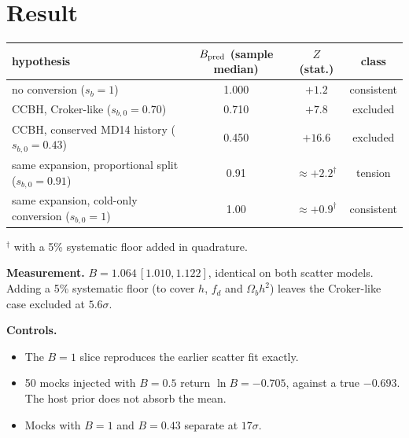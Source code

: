 \documentclass[10pt]{article}
\begin{document}
\section{Result}
\begin{center}
\begin{tabular}{lccc}
\toprule
hypothesis & $B_{\rm pred}$ (sample median) & $Z$ (stat.) & class\\
\midrule
no conversion ($s_b=1$) & 1.000 & $+1.2$ & consistent\\
CCBH, Croker-like ($s_{b,0}=0.70$) & 0.710 & $+7.8$ & excluded\\
CCBH, conserved MD14 history ($s_{b,0}=0.43$) & 0.450 & $+16.6$ & excluded\\
same expansion, proportional split ($s_{b,0}=0.91$) & 0.91 & $\approx+2.2^{\dagger}$ & tension\\
same expansion, cold-only conversion ($s_{b,0}=1$) & 1.00 & $\approx+0.9^{\dagger}$ & consistent\\
\bottomrule
\end{tabular}
\end{center}
{\footnotesize $^\dagger$ with a 5\% systematic floor added in quadrature.}

\textbf{Measurement.} $B=1.064\,[1.010,1.122]$, identical on both scatter models. Adding a 5\% systematic floor (to cover $h$, $f_d$ and $\Omega_bh^2$) leaves the Croker-like case excluded at $5.6\sigma$.

\textbf{Controls.}
\begin{itemize}
\item The $B=1$ slice reproduces the earlier scatter fit exactly.
\item 50 mocks injected with $B=0.5$ return $\ln B=-0.705$, against a true $-0.693$. The host prior does not absorb the mean.
\item Mocks with $B=1$ and $B=0.43$ separate at $17\sigma$.
\end{itemize}
\end{document}

